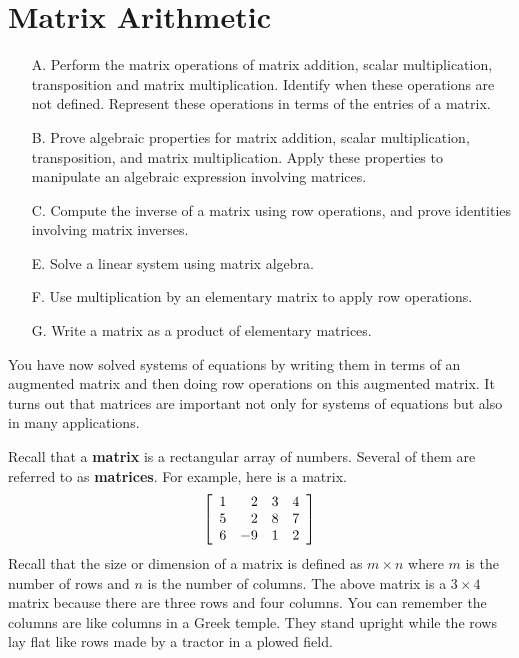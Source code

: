 \section{Matrix Arithmetic}

\begin{outcome}
\begin{enumerate}
\item[A.] Perform the matrix operations of matrix addition, scalar
multiplication, transposition and matrix multiplication. Identify when
these operations are not defined. Represent these operations in terms
of the entries of a matrix.

\item[B.] Prove algebraic properties for matrix addition, scalar
multiplication, transposition, and matrix multiplication. Apply these
properties to manipulate an algebraic expression involving matrices.

\item[C.] Compute the inverse of a matrix using row operations, and prove identities involving
matrix inverses.

\item[E.] Solve a linear system using matrix algebra.

\item[F.] Use multiplication by an elementary matrix to apply row operations. 

\item[G.] Write a matrix as a product of elementary matrices.

\end{enumerate}
\end{outcome}

You have now solved systems of equations by writing them in terms of an
augmented matrix and then doing row operations on this augmented matrix. It
turns out that matrices are important not only for systems of equations but also in many applications.

Recall that a  \textbf{matrix}
is a rectangular array of numbers. Several of them are
referred to as \textbf{matrices}. For example, here is a matrix.
\begin{equation}
\left[
\begin{array}{rrrr}
1 & 2 & 3 & 4 \\
5 & 2 & 8 & 7 \\
6 & -9 & 1 & 2
\end{array}
\right]
\label{matrix}
\end{equation}
Recall that the size or dimension of a matrix is defined as $m\times n$ where $m$ is the
number of rows and $n$ is the number of columns. The above matrix is a 
$3\times 4$ matrix because there are three rows and four columns.  You can remember the columns are
like columns in a Greek temple. They stand upright while the rows lay
flat like rows made by a tractor in a plowed field.


